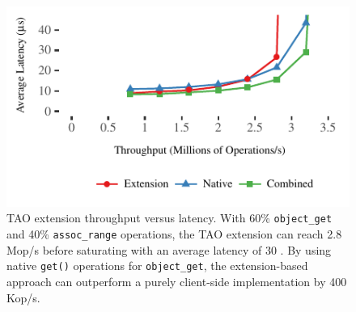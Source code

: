 \begin{figure}[t]
\includegraphics[width=\textwidth]{graphs/tao.pdf}
\caption{
TAO extension throughput versus latency. With 60\% \texttt{object\_get}
and 40\%
\texttt{assoc\_range} operations, the TAO extension can reach 2.8 Mop/s before
saturating with an average latency of 30 \us. By using native
\texttt{get()}
operations for \texttt{object\_get}, the extension-based approach can outperform a
purely client-side implementation by 400 Kop/s.
}
\label{fig:tao}
\end{figure}
